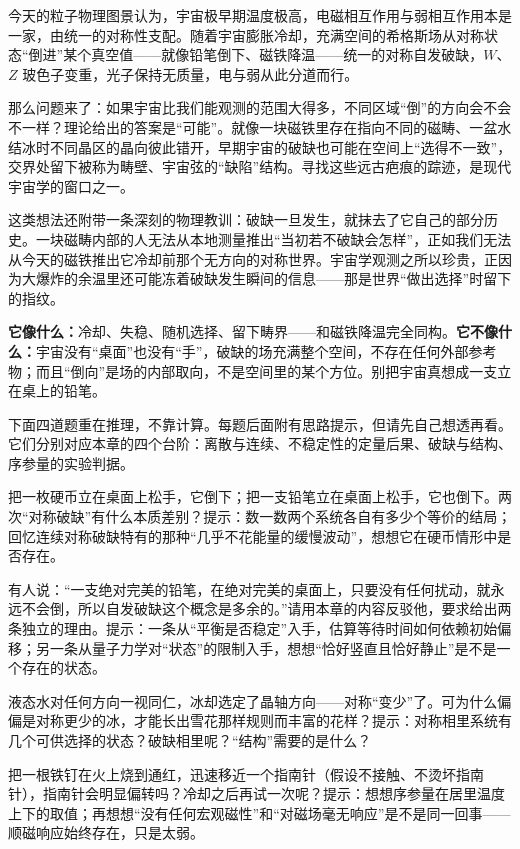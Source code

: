 \begin{thought}[宇宙是一支冷却的铅笔]
今天的粒子物理图景认为，宇宙极早期温度极高，电磁相互作用与弱相互作用本是一家，由统一的对称性支配。随着宇宙膨胀冷却，充满空间的希格斯场从对称状态“倒进”某个真空值——就像铅笔倒下、磁铁降温——统一的对称自发破缺，\(W\)、\(Z\) 玻色子变重，光子保持无质量，电与弱从此分道而行。

那么问题来了：如果宇宙比我们能观测的范围大得多，不同区域“倒”的方向会不会不一样？理论给出的答案是“可能”。就像一块磁铁里存在指向不同的磁畴、一盆水结冰时不同晶区的晶向彼此错开，早期宇宙的破缺也可能在空间上“选得不一致”，交界处留下被称为畴壁、宇宙弦的“缺陷”结构。寻找这些远古疤痕的踪迹，是现代宇宙学的窗口之一。

这类想法还附带一条深刻的物理教训：破缺一旦发生，就抹去了它自己的部分历史。一块磁畴内部的人无法从本地测量推出“当初若不破缺会怎样”，正如我们无法从今天的磁铁推出它冷却前那个无方向的对称世界。宇宙学观测之所以珍贵，正因为大爆炸的余温里还可能冻着破缺发生瞬间的信息——那是世界“做出选择”时留下的指纹。

\textbf{它像什么：}冷却、失稳、随机选择、留下畴界——和磁铁降温完全同构。\textbf{它不像什么：}宇宙没有“桌面”也没有“手”，破缺的场充满整个空间，不存在任何外部参考物；而且“倒向”是场的内部取向，不是空间里的某个方位。别把宇宙真想成一支立在桌上的铅笔。
\end{thought}

\begin{mainline}
下面四道题重在推理，不靠计算。每题后面附有思路提示，但请先自己想透再看。它们分别对应本章的四个台阶：离散与连续、不稳定性的定量后果、破缺与结构、序参量的实验判据。

\begin{puzzles}
  \item 把一枚硬币立在桌面上松手，它倒下；把一支铅笔立在桌面上松手，它也倒下。两次“对称破缺”有什么本质差别？提示：数一数两个系统各自有多少个等价的结局；回忆连续对称破缺特有的那种“几乎不花能量的缓慢波动”，想想它在硬币情形中是否存在。
  \item 有人说：“一支绝对完美的铅笔，在绝对完美的桌面上，只要没有任何扰动，就永远不会倒，所以自发破缺这个概念是多余的。”请用本章的内容反驳他，要求给出两条独立的理由。提示：一条从“平衡是否稳定”入手，估算等待时间如何依赖初始偏移；另一条从量子力学对“状态”的限制入手，想想“恰好竖直且恰好静止”是不是一个存在的状态。
  \item 液态水对任何方向一视同仁，冰却选定了晶轴方向——对称“变少”了。可为什么偏偏是对称更少的冰，才能长出雪花那样规则而丰富的花样？提示：对称相里系统有几个可供选择的状态？破缺相里呢？“结构”需要的是什么？
  \item 把一根铁钉在火上烧到通红，迅速移近一个指南针（假设不接触、不烫坏指南针），指南针会明显偏转吗？冷却之后再试一次呢？提示：想想序参量在居里温度上下的取值；再想想“没有任何宏观磁性”和“对磁场毫无响应”是不是同一回事——顺磁响应始终存在，只是太弱。
\end{puzzles}
\end{mainline}

